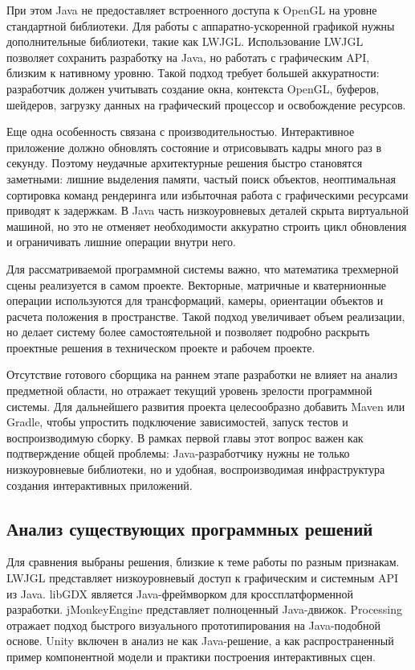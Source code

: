 При этом Java не предоставляет встроенного доступа к OpenGL на уровне
стандартной библиотеки. Для работы с аппаратно-ускоренной графикой нужны
дополнительные библиотеки, такие как LWJGL. Использование LWJGL позволяет
сохранить разработку на Java, но работать с графическим API, близким к
нативному уровню. Такой подход требует большей аккуратности: разработчик
должен учитывать создание окна, контекста OpenGL, буферов, шейдеров,
загрузку данных на графический процессор и освобождение ресурсов.

Еще одна особенность связана с производительностью. Интерактивное
приложение должно обновлять состояние и отрисовывать кадры много раз в
секунду. Поэтому неудачные архитектурные решения быстро становятся
заметными: лишние выделения памяти, частый поиск объектов, неоптимальная
сортировка команд рендеринга или избыточная работа с графическими
ресурсами приводят к задержкам. В Java часть низкоуровневых деталей
скрыта виртуальной машиной, но это не отменяет необходимости аккуратно
строить цикл обновления и ограничивать лишние операции внутри него.

Для рассматриваемой программной системы важно, что математика
трехмерной сцены реализуется в самом проекте. Векторные, матричные и
кватернионные операции используются для трансформаций, камеры,
ориентации объектов и расчета положения в пространстве. Такой подход
увеличивает объем реализации, но делает систему более самостоятельной и
позволяет подробно раскрыть проектные решения в техническом проекте и
рабочем проекте.

Отсутствие готового сборщика на раннем этапе разработки не влияет на
анализ предметной области, но отражает текущий уровень зрелости
программной системы. Для дальнейшего развития проекта целесообразно
добавить Maven или Gradle, чтобы упростить подключение зависимостей,
запуск тестов и воспроизводимую сборку. В рамках первой главы этот вопрос
важен как подтверждение общей проблемы: Java-разработчику нужны не
только низкоуровневые библиотеки, но и удобная, воспроизводимая
инфраструктура создания интерактивных приложений.

\subsection{Анализ существующих программных решений}

Для сравнения выбраны решения, близкие к теме работы по разным
признакам. LWJGL представляет низкоуровневый доступ к графическим и
системным API из Java. libGDX является Java-фреймворком для
кроссплатформенной разработки. jMonkeyEngine представляет полноценный
Java-движок. Processing отражает подход быстрого визуального
прототипирования на Java-подобной основе. Unity включен в анализ не как
Java-решение, а как распространенный пример компонентной модели и
практики построения интерактивных сцен.

